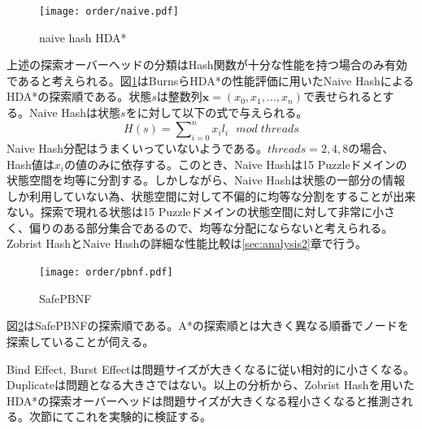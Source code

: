 \documentclass[uplatex]{jsarticle}
\begin{document}
\begin{figure}
	\centering
	\texttt{[image: order/naive.pdf]}
	\caption{naive hash HDA*}
	\label{fig:order_naive_hash}
\end{figure}
上述の探索オーバーヘッドの分類はHash関数が十分な性能を持つ場合のみ有効であると考えられる。図\ref{fig:order_naive_hash}はBurnsらHDA*の性能評価に用いたNaive HashによるHDA*の探索順である。状態$s$は整数列$\mathbf{x} = (x_{0}, x_{1}, …, x_{n})$で表せられるとする。Naive Hashは状態$s$をに対して以下の式で与えられる。
\newline
\begin{equation}
	H(s) = \sum\nolimits_{i = 0}^{n}x_{i} l_{i}\:\:\: mod\; threads
\end{equation}
\newline
Naive Hash分配はうまくいっていないようである。$threads = 2, 4, 8$の場合、Hash値は$x_{i}$の値のみに依存する。このとき、Naive Hashは15 Puzzleドメインの状態空間を均等に分割する。しかしながら、Naive Hashは状態の一部分の情報しか利用していない為、状態空間に対して不偏的に均等な分割をすることが出来ない。探索で現れる状態は15 Puzzleドメインの状態空間に対して非常に小さく、偏りのある部分集合であるので、均等な分配にならないと考えられる。Zobrist HashとNaive Hashの詳細な性能比較は\ref{sec:analysis2}章で行う。

\begin{figure}
	\centering
	\texttt{[image: order/pbnf.pdf]}
	\caption{SafePBNF}
	\label{fig:order_safepbnf}
\end{figure}

図\ref{fig:order_safepbnf}はSafePBNFの探索順である。A*の探索順とは大きく異なる順番でノードを探索していることが伺える。
\newline

Bind Effect, Burst Effectは問題サイズが大きくなるに従い相対的に小さくなる。Duplicateは問題となる大きさではない。以上の分析から、Zobrist Hashを用いたHDA*の探索オーバーヘッドは問題サイズが大きくなる程小さくなると推測される。次節にてこれを実験的に検証する。
\end{document}
